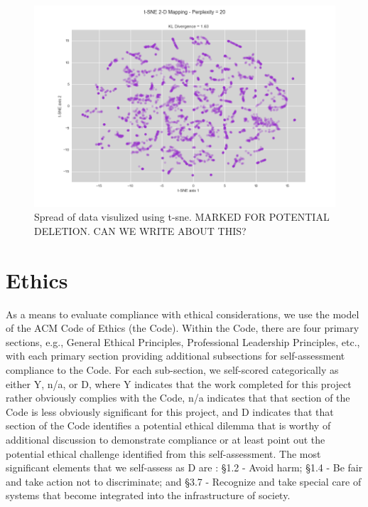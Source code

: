 \documentclass{llncs}
\begin{document}
\FloatBarrier
\begin{figure}
 	\includegraphics[width=\textwidth, height=\textheight, keepaspectratio]{perplexity.png}
 	\caption{Spread of data visulized using t-sne. MARKED FOR POTENTIAL DELETION. CAN WE WRITE ABOUT THIS?}
	\label{figure:perplexity}

\end{figure}
\FloatBarrier

%
%
\section{Ethics}
%
As a means to evaluate compliance with ethical considerations, we use the model of the ACM Code of Ethics  (the Code). Within the Code, there are four primary sections, e.g., General Ethical Principles, Professional Leadership Principles, etc., with each primary section providing additional subsections for self-assessment compliance to the Code. For each sub-section, we self-scored categorically as either Y, n/a, or D, where Y indicates that the work completed for this project rather obviously complies with the Code, n/a indicates that that section of the Code is less obviously significant for this project, and D indicates that that section of the Code identifies a potential ethical dilemma that is worthy of additional discussion to demonstrate compliance or at least point out the potential ethical challenge identified from this self-assessment.
The most significant elements that we self-assess as D are : \S 1.2 - Avoid harm; \S 1.4 - Be fair and take action not to discriminate; and \S 3.7 - Recognize and take special care of systems that become integrated into the infrastructure of society.
\end{document}
